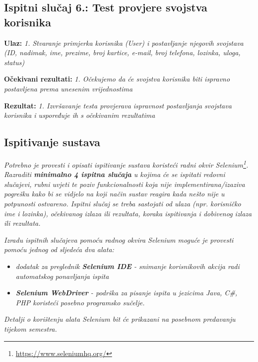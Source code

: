             \subsection{Ispitni slučaj 6.: Test provjere svojstva korisnika}

                                                                                    \textbf{Ulaz:}
                                                                                    \textit{1. Stvaranje primjerka korisnika (User) i postavljanje njegovih svojstava (ID, nadimak, ime, prezime, broj kartice, e-mail, broj telefona, lozinka, uloga, status)}

                                                                                    \textbf{Očekivani rezultati:}
                                                                                    \textit{1. Očekujemo da će svojstva korisnika biti ispravno postavljena prema unesenim vrijednostima}

                                                                                    \textbf{Rezultat:}
                                                                                    \textit{1. Izvršavanje testa provjerava ispravnost postavljanja svojstava korisnika i uspoređuje ih s očekivanim rezultatima}



			\subsection{Ispitivanje sustava}
						 \textit{Potrebno je provesti i opisati ispitivanje sustava koristeći radni okvir Selenium\footnote{\url{https://www.seleniumhq.org/}}. Razraditi \textbf{minimalno 4 ispitna slučaja} u kojima će se ispitati redovni slučajevi, rubni uvjeti te poziv funkcionalnosti koja nije implementirana/izaziva pogrešku kako bi se vidjelo na koji način sustav reagira kada nešto nije u potpunosti ostvareno. Ispitni slučaj se treba sastojati od ulaza (npr. korisničko ime i lozinka), očekivanog izlaza ili rezultata, koraka ispitivanja i dobivenog izlaza ili rezultata.\\ }
			 
			 \textit{Izradu ispitnih slučajeva pomoću radnog okvira Selenium moguće je provesti pomoću jednog od sljedeća dva alata:}
			 \begin{itemize}
			 	\item \textit{dodatak za preglednik \textbf{Selenium IDE} - snimanje korisnikovih akcija radi automatskog ponavljanja ispita	}
			 	\item \textit{\textbf{Selenium WebDriver} - podrška za pisanje ispita u jezicima Java, C\#, PHP koristeći posebno programsko sučelje.}
			 \end{itemize}
		 	\textit{Detalji o korištenju alata Selenium bit će prikazani na posebnom predavanju tijekom semestra.}
			
